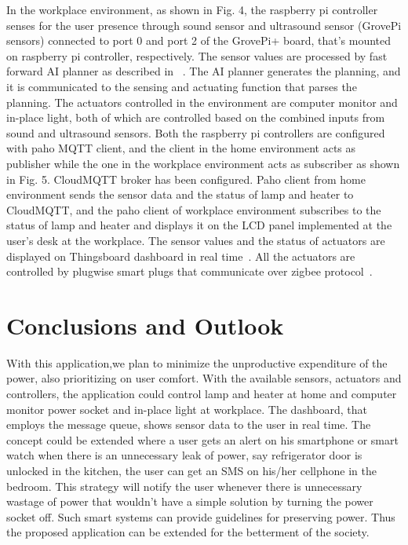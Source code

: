 \documentclass[runningheads]{llncs}
\begin{document}
In the workplace environment, as shown in Fig. 4,  the raspberry pi controller senses for the user presence through sound sensor and ultrasound sensor (GrovePi sensors) connected to port 0 and port 2 of the GrovePi+ board, that's mounted on raspberry pi controller,  respectively. The sensor values are processed by fast forward AI planner as described in ~\cite{ref_article1}. The AI planner generates the planning, and it is communicated to the sensing and actuating function that parses the planning. The actuators controlled in the environment are computer monitor and in-place light, both of which are controlled based on the combined inputs from sound and ultrasound sensors.\newline
\newline
Both the raspberry pi controllers are configured with paho MQTT client, and the client in the home environment acts as publisher while the one in the workplace environment acts as subscriber as shown in Fig. 5. CloudMQTT broker has been configured. Paho client from home environment sends the sensor data and the status of lamp and heater to CloudMQTT, and the paho client of workplace environment subscribes to the status of lamp and heater and displays it on the LCD panel implemented at the user's desk at the workplace. The sensor values and the status of actuators are displayed on Thingsboard dashboard in real time~\cite{ref_url2}. All the actuators are controlled by plugwise smart plugs that communicate over zigbee protocol~\cite{2}. 


\section{Conclusions and Outlook}
With this application,we plan to minimize the unproductive expenditure of the power, also prioritizing on user comfort. With the available sensors, actuators and controllers, the application could control lamp and heater at home and computer monitor power socket and in-place light at workplace. The dashboard, that employs the message queue, shows sensor data to the user in real time. The concept could be extended where a user gets an alert on his smartphone or smart watch when there is an unnecessary leak of power, say refrigerator door is unlocked in the kitchen, the user can get an SMS on his/her cellphone in the bedroom. This strategy will notify the user whenever there is unnecessary wastage of power that wouldn't have a simple solution by turning the power socket off. Such smart systems can provide guidelines for preserving power. Thus the proposed application can be extended for the betterment of the society.

%
%


\end{document}
